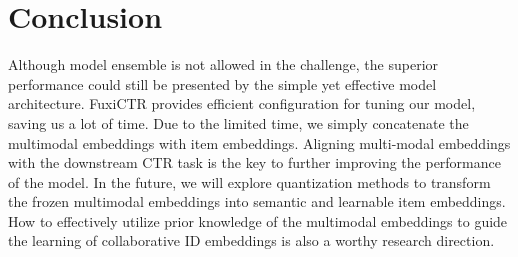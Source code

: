 \documentclass[sigconf, nonacm, screen]{acmart}
\begin{document}
\section{Conclusion}
Although model ensemble is not allowed in the challenge, the superior performance could still be presented by the simple yet effective model architecture.
FuxiCTR provides efficient configuration for tuning our model, saving us a lot of time.
Due to the limited time, we simply concatenate the multimodal embeddings with item embeddings.
Aligning multi-modal embeddings with the downstream CTR task is the key to further improving the performance of the model.
In the future, we will explore quantization methods to transform the frozen multimodal embeddings into semantic and learnable item embeddings.
How to effectively utilize prior knowledge of the multimodal embeddings to guide the learning of collaborative ID embeddings is also a worthy research direction.




\end{document}
